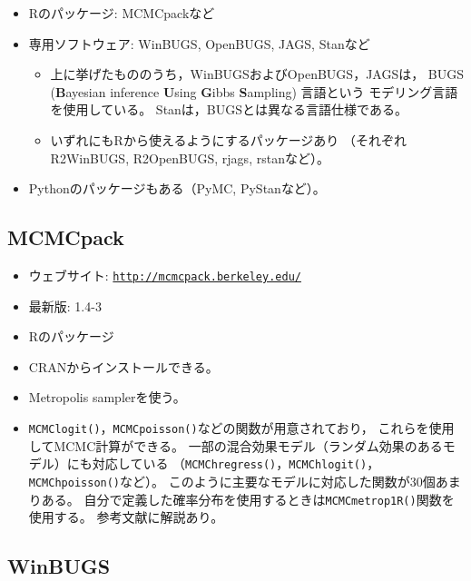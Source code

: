 \documentclass[11pt,uplatex]{jsarticle}
\begin{document}
\begin{itemize}
\item  \textsf{R}のパッケージ: \textsf{MCMCpack}など
\item 専用ソフトウェア: \textsf{WinBUGS}, \textsf{OpenBUGS}, \textsf{JAGS}, \textsf{Stan}など
\begin{itemize}
 \item  上に挙げたもののうち，\textsf{WinBUGS}および\textsf{OpenBUGS}，\textsf{JAGS}は，
 BUGS (\textbf{B}ayesian inference \textbf{U}sing \textbf{G}ibbs \textbf{S}ampling)
 言語\cite{BUGSBook, BUGS}という モデリング言語を使用している。
 \label{BUGS}
\textsf{Stan}は，BUGSとは異なる言語仕様である。
\item  いずれにも\textsf{R}から使えるようにするパッケージあり
（それぞれ\textsf{R2WinBUGS}, \textsf{R2OpenBUGS}, \textsf{rjags}, \textsf{rstan}など）。
\end{itemize}
\item \textsf{Python}のパッケージもある（\textsf{PyMC}, \textsf{PyStan}など）。
\end{itemize}

\subsection{MCMCpack}

\begin{itemize}
\item ウェブサイト: \texttt{\url{http://mcmcpack.berkeley.edu/}}
\item 最新版: 1.4-3
\item \textsf{R}のパッケージ
\item CRANからインストールできる。
\item Metropolis samplerを使う。
\item \texttt{MCMClogit()}，\texttt{MCMCpoisson()}などの関数が用意されており，
これらを使用してMCMC計算ができる。
一部の混合効果モデル（ランダム効果のあるモデル）にも対応している
（\texttt{MCMChregress()}，\texttt{MCMChlogit()}，
\texttt{MCMChpoisson()}など）。
このように主要なモデルに対応した関数が30個あまりある。
自分で定義した確率分布を使用するときは\texttt{MCMCmetrop1R()}関数を使用する。
参考文献\cite{MCMCpack}に解説あり。
\end{itemize}

\subsection{WinBUGS}
\end{document}
